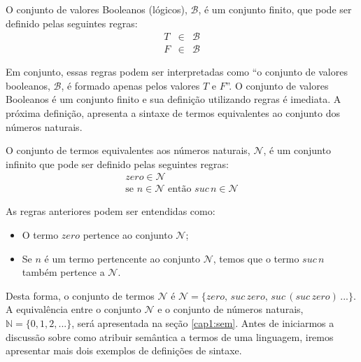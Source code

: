 \begin{Definition}
  O conjunto de valores Booleanos (l\'ogicos), $\mathcal{B}$, \'e um conjunto finito, que pode ser definido pelas seguintes regras:
  \[
      \begin{array}{lcl}
        T & \in & \mathcal{B}\\
        F & \in & \mathcal{B}
      \end{array}
  \]
\end{Definition}

Em conjunto, essas regras podem ser interpretadas como ``o conjunto de valores booleanos, $\mathcal{B}$, \'e formado apenas pelos valores 
$T$ e $F$''.
O conjunto de valores Booleanos \'e um conjunto finito e sua defini\c{c}\~ao utilizando regras \'e imediata. A pr\'oxima defini\c{c}\~ao,
apresenta a sintaxe de termos equivalentes ao conjunto dos n\'umeros naturais.

\begin{Definition}
O conjunto de termos equivalentes aos n\'umeros naturais, $\mathcal{N}$, \'e um conjunto infinito que pode ser definido pelas seguintes regras:
\[
   \begin{array}{l}
     zero \in \mathcal{N}\\
     \text{se }n \in \mathcal{N} \text{ ent\~ao }suc\,n\in\mathcal{N}
   \end{array}
\]
\end{Definition}

As regras anteriores podem ser entendidas como:
\begin{itemize}
  \item O termo $zero$ pertence ao conjunto $\mathcal{N}$;
  \item Se $n$ \'e um termo pertencente ao conjunto $\mathcal{N}$, temos que o termo $suc\,n$ tamb\'em pertence a $\mathcal{N}$.
\end{itemize}
Desta forma, o conjunto de termos $\mathcal{N}$ \'e $\mathcal{N}=\{zero,\,suc\,zero,\,suc\,(suc\,zero)\,...\}$. A equival\^encia entre o 
conjunto $\mathcal{N}$ e o conjunto de n\'umeros naturais, $\mathbb{N} = \{0,1,2,...\}$, ser\'a apresentada na se\c{c}\~ao \ref{cap1:sem}.
Antes de iniciarmos a discuss\~ao sobre como atribuir sem\^antica a termos de uma linguagem, iremos apresentar mais dois exemplos de 
defini\c{c}\~oes de sintaxe.

